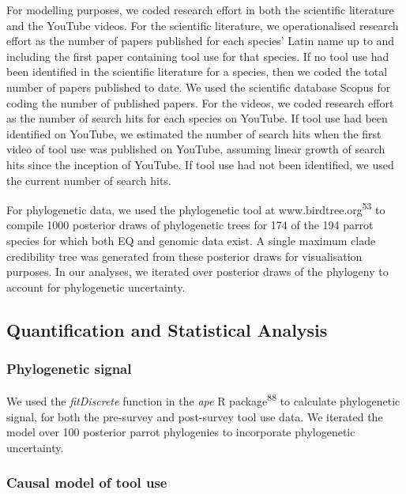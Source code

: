 \documentclass[
  man, donotrepeattitle,floatsintext]{apa6}
\begin{document}
For modelling purposes, we coded research effort in both the scientific
literature and the YouTube videos. For the scientific literature, we
operationalised research effort as the number of papers published for each
species' Latin name up to and including the first paper containing tool use for
that species. If no tool use had been identified in the scientific literature
for a species, then we coded the total number of papers published to date. We
used the scientific database Scopus for coding the number of published papers.
For the videos, we coded research effort as the number of search hits for each
species on YouTube. If tool use had been identified on YouTube, we estimated the
number of search hits when the first video of tool use was published on YouTube,
assuming linear growth of search hits since the inception of YouTube. If tool
use had not been identified, we used the current number of search hits.

For phylogenetic data, we used the phylogenetic tool at www.birdtree.org\textsuperscript{53} to compile 1000 posterior draws of phylogenetic trees for 174 of the
194 parrot species for which both EQ and genomic data exist. A single maximum
clade credibility tree was generated from these posterior draws for
visualisation purposes. In our analyses, we iterated over posterior draws of the
phylogeny to account for phylogenetic uncertainty.

\hypertarget{quantification-and-statistical-analysis}{%
\subsection{Quantification and Statistical Analysis}\label{quantification-and-statistical-analysis}}

\hypertarget{phylogenetic-signal}{%
\subsubsection{Phylogenetic signal}\label{phylogenetic-signal}}

We used the \emph{fitDiscrete} function in the \emph{ape} R package\textsuperscript{88} to
calculate phylogenetic signal, for both the pre-survey and post-survey tool use
data. We iterated the model over 100 posterior parrot phylogenies to incorporate
phylogenetic uncertainty.

\hypertarget{causal-model-of-tool-use}{%
\subsubsection{Causal model of tool use}\label{causal-model-of-tool-use}}
\end{document}
